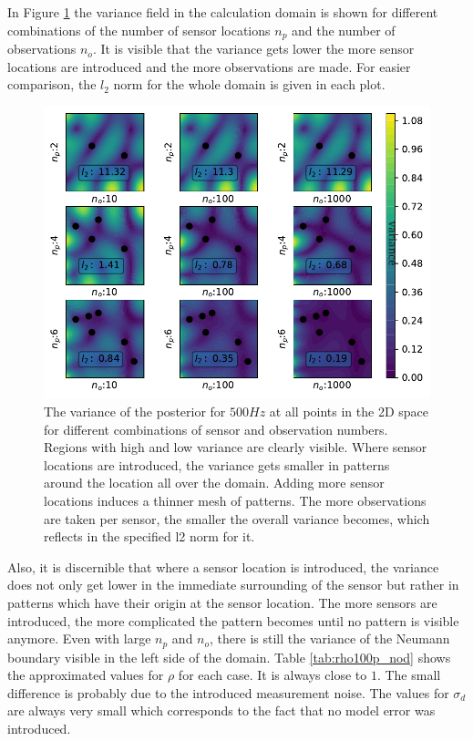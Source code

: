 \documentclass[%
  a4paper,oneside,%
  11pt,%
  smallchapters,
  style=printdev,
  extramargin,
  green,%
  rgb, <cmyk>
  ]{tubsbook}
\begin{document}
In Figure \ref{fig:100proc_no_d} the variance field in the calculation domain is shown for different combinations of the number of sensor locations $n_p$ and the number of observations $n_o$. It is visible that the variance gets lower the more sensor locations are introduced and the more observations are made. For easier comparison, the $l_2$ norm for the whole domain is given in each plot.
\begin{figure}[!ht]
\includegraphics[width=.9\textwidth]{../../Python/Results/2D/100procent_no_d/VarField_Posterior.pdf}
\centering
\caption[Posterior of the 2D Helmholtz equation example for different numbers of sensors and observations]{The variance of the posterior for $500Hz$ at all points in the 2D space for different combinations of sensor and observation numbers. Regions with high and low variance are clearly visible. Where sensor locations are introduced, the variance gets smaller in patterns around the location all over the domain. Adding more sensor locations induces a thinner mesh of patterns. The more observations are taken per sensor, the smaller the overall variance becomes, which reflects in the specified l2 norm for it.}
\label{fig:100proc_no_d}
\end{figure}
Also, it is discernible that where a sensor location is introduced, the variance does not only get lower in the immediate surrounding of the sensor but rather in patterns which have their origin at the sensor location. The more sensors are introduced, the more complicated the pattern becomes until no pattern is visible anymore. Even with large $n_p$ and $n_o$, there is still the variance of the Neumann boundary visible in the left side of the domain.
Table \ref{tab:rho100p_nod} shows the approximated values for $\rho$ for each case. It is always close to $1$. The small difference is probably due to the introduced measurement noise. The values for $\sigma_d$ are always very small which corresponds to the fact that no model error was introduced.
\end{document}
